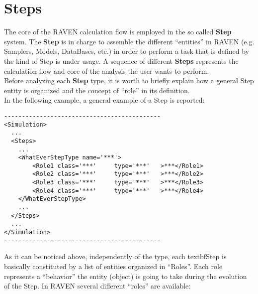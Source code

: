 \section{Steps  \\ \vspace{2 mm} {\small }}
\label{sec:steps}
The core of the RAVEN calculation flow is employed in the so called \textbf{Step} system. The \textbf{Step} is in charge to assemble the different ``entities'' in RAVEN (e.g. Samplers, Models, DataBases, etc.) in order to perform a task that is defined by the kind of Step is under usage. A sequence of different \textbf{Steps} represents the calculation flow and core of the analysis the user wants to perform. 
\\Before analyzing each \textbf{Step} type, it is worth to briefly explain how a general Step entity is organized and the concept of ``role'' in its definition.
\\In the following example, a general example of a Step is reported:
\begin{lstlisting}[style=XML]
--------------------------------------------
<Simulation>
  ...
  <Steps>
    ...
    <WhatEverStepType name='***'>
        <Role1 class='***'     type='***'   >***</Role1>
        <Role2 class='***'     type='***'   >***</Role2>
        <Role3 class='***'     type='***'   >***</Role3>
        <Role4 class='***'     type='***'   >***</Role4>
    </WhatEverStepType>
    ...
  </Steps>
  ...
</Simulation>
--------------------------------------------
\end{lstlisting}
As it can be noticed above, independently of the type, each textbf{Step}  is basically constituted by a list of entities organized in ``Roles''.  Each role represents a ``behavior'' the entity (object) is going to take during the evolution of the Step.
In RAVEN several different ``roles'' are available:
